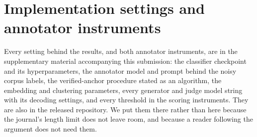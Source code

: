 \documentclass[preprint,12pt]{elsarticle}
\begin{document}
  \section{Implementation settings and annotator instruments}\label{appendix:settings}
Every setting behind the results, and both annotator instruments, are in the supplementary
material accompanying this submission: the classifier checkpoint and its hyperparameters, the
annotator model and prompt behind the noisy corpus labels, the verified-anchor procedure stated
as an algorithm, the embedding and clustering parameters, every generator and judge model string
with its decoding settings, and every threshold in the scoring instruments. They are also in the
released repository. We put them there rather than here because the journal's length limit does
not leave room, and because a reader following the argument does not need them.
\end{document}
